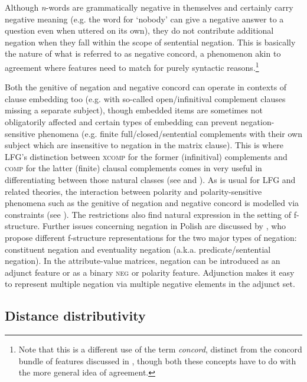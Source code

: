 \documentclass[output=paper,hidelinks]{langscibook}
\begin{document}
Although \textit{n}-words are grammatically negative in themselves and certainly carry negative meaning (e.g. the word for `nobody' can give a negative answer to a question even when uttered on its own), they do not contribute additional negation when they fall within the scope of sentential negation. This is basically the nature of what is referred to as negative concord, a phenomenon akin to agreement where features need to match for purely syntactic reasons.\footnote{Note that this is a different use of the term \textit{concord}, distinct from the concord bundle of features discussed in , though both these concepts have to do with the more general idea of agreement.}

Both the genitive of negation and negative concord can operate in contexts of clause embedding too (e.g. with so-called open/infinitival complement clauses missing a separate subject), though embedded items are sometimes not obligatorily affected and certain types of embedding can prevent negation-sensitive phenomena (e.g. finite full/closed/sentential complements with their own subject which are insensitive to negation in the matrix clause). This is where LFG's distinction between \textsc{xcomp} for the former (infinitival) complements and \textsc{comp} for the latter (finite) clausal complements comes in very useful in differentiating between those natural classes (see \citealt{prze:00aa} and \citealt{PatejukPrzepiorkowski2014a}). As is usual for LFG and related theories, the interaction between polarity and polarity-sensitive phenomena such as the genitive of negation and negative concord is modelled via constraints (see ). The restrictions also find natural expression in the setting of f-structure. Further issues concerning negation in Polish are discussed by \citet{przepiorkowski2015two}, who propose different f-structure representations for the two major types of negation: constituent negation and eventuality negation (a.k.a. predicate/sentential negation). In the attribute-value matrices, negation can be introduced as an adjunct feature or as a binary \textsc{neg} or polarity feature. Adjunction makes it easy to represent multiple negation via multiple negative elements in the adjunct set.

\subsection{Distance distributivity}
\label{sec:Slavic:2.10}
\end{document}
